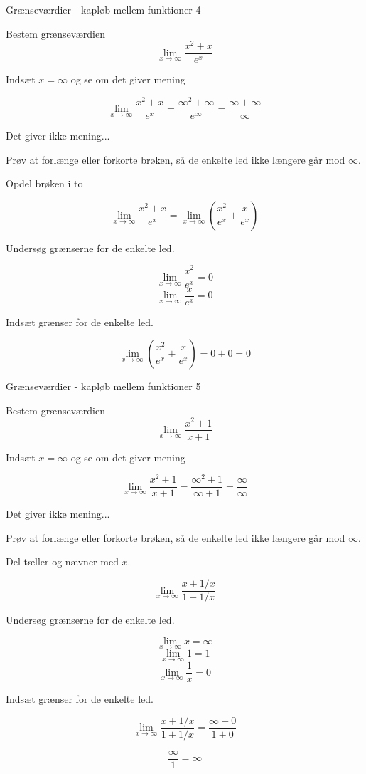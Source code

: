\documentclass{article}
\begin{document}
\begin{exercise}{Grænseværdier - kapløb mellem funktioner 4}

Bestem grænseværdien
\[
\lim_{x \to \infty} \frac{x^2 + x}{e^x}
\]


\hint
Indsæt $x=\infty$ og se om det giver mening

\hint
\[
\lim_{x \to \infty} \frac{x^2 + x}{e^x} = \frac{\infty^2 + \infty}{e^\infty} = \frac{\infty + \infty}{\infty}
\]

\hint
Det giver ikke mening...

\hint
Prøv at forlænge eller forkorte brøken, så de enkelte led ikke længere går mod $\infty$.

\hint
Opdel brøken i to

\hint
\[
\lim_{x \to \infty} \frac{x^2 + x}{e^x} = \lim_{x \to \infty} \left( \frac{x^2}{e^x} + \frac{x}{e^x} \right)
\]

\hint
Undersøg grænserne for de enkelte led.

\hint
\[
\lim_{x \to \infty} \frac{x^2}{e^x} = 0
\]
\[
\lim_{x \to \infty} \frac{x}{e^x} = 0
\]

\hint
Indsæt grænser for de enkelte led.

\hint
\[
\lim_{x \to \infty} \left( \frac{x^2}{e^x} + \frac{x}{e^x} \right) = 0 + 0 = 0
\]


\end{exercise}
\newpage

\begin{exercise}{Grænseværdier - kapløb mellem funktioner 5}

Bestem grænseværdien
\[
\lim_{x \to \infty} \frac{x^2 + 1}{x + 1}
\]


\hint
Indsæt $x=\infty$ og se om det giver mening

\hint
\[
\lim_{x \to \infty} \frac{x^2 + 1}{x + 1} = \frac{\infty^2 + 1}{\infty+ 1} = \frac{\infty}{\infty}
\]

\hint
Det giver ikke mening...

\hint
Prøv at forlænge eller forkorte brøken, så de enkelte led ikke længere går mod $\infty$.

\hint
Del tæller og nævner med $x$.

\hint
\[
\lim_{x \to \infty} \frac{x + 1/x}{1 + 1/x}
\]

\hint
Undersøg grænserne for de enkelte led.

\hint
\[
\lim_{x \to \infty} x = \infty
\]
\[
\lim_{x \to \infty} 1 = 1
\]
\[
\lim_{x \to \infty} \frac{1}{x} = 0
\]

\hint
Indsæt grænser for de enkelte led.

\hint
\[
\lim_{x \to \infty} \frac{x + 1/x}{1 + 1/x} = \frac{\infty + 0}{1 + 0}
\]

\hint
\[
\frac{\infty}{1} = \infty
\]

\end{exercise}
\newpage
\end{document}
